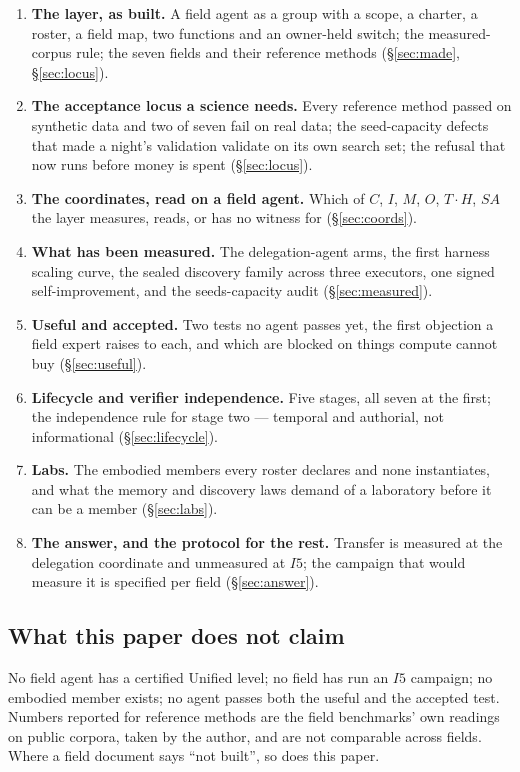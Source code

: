 \begin{enumerate}[leftmargin=*,itemsep=2pt]
\item \textbf{The layer, as built.} A field agent as a group with a scope, a charter, a roster, a field map, two functions and an owner-held switch; the measured-corpus rule; the seven fields and their reference methods (\S\ref{sec:made}, \S\ref{sec:locus}).
\item \textbf{The acceptance locus a science needs.} Every reference method passed on synthetic data and two of seven fail on real data; the seed-capacity defects that made a night's validation validate on its own search set; the refusal that now runs before money is spent (\S\ref{sec:locus}).
\item \textbf{The coordinates, read on a field agent.} Which of $C$, $I$, $M$, $O$, $T\cdot H$, $SA$ the layer measures, reads, or has no witness for (\S\ref{sec:coords}).
\item \textbf{What has been measured.} The delegation-agent arms, the first harness scaling curve, the sealed discovery family across three executors, one signed self-improvement, and the seeds-capacity audit (\S\ref{sec:measured}).
\item \textbf{Useful and accepted.} Two tests no agent passes yet, the first objection a field expert raises to each, and which are blocked on things compute cannot buy (\S\ref{sec:useful}).
\item \textbf{Lifecycle and verifier independence.} Five stages, all seven at the first; the independence rule for stage two --- temporal and authorial, not informational (\S\ref{sec:lifecycle}).
\item \textbf{Labs.} The embodied members every roster declares and none instantiates, and what the memory and discovery laws demand of a laboratory before it can be a member (\S\ref{sec:labs}).
\item \textbf{The answer, and the protocol for the rest.} Transfer is measured at the delegation coordinate and unmeasured at $I5$; the campaign that would measure it is specified per field (\S\ref{sec:answer}).
\end{enumerate}

\subsection{What this paper does not claim}

No field agent has a certified Unified level; no field has run an $I5$ campaign; no embodied member exists; no agent passes both the useful and the accepted test. Numbers reported for reference methods are the field benchmarks' own readings on public corpora, taken by the author, and are not comparable across fields. Where a field document says ``not built'', so does this paper.

